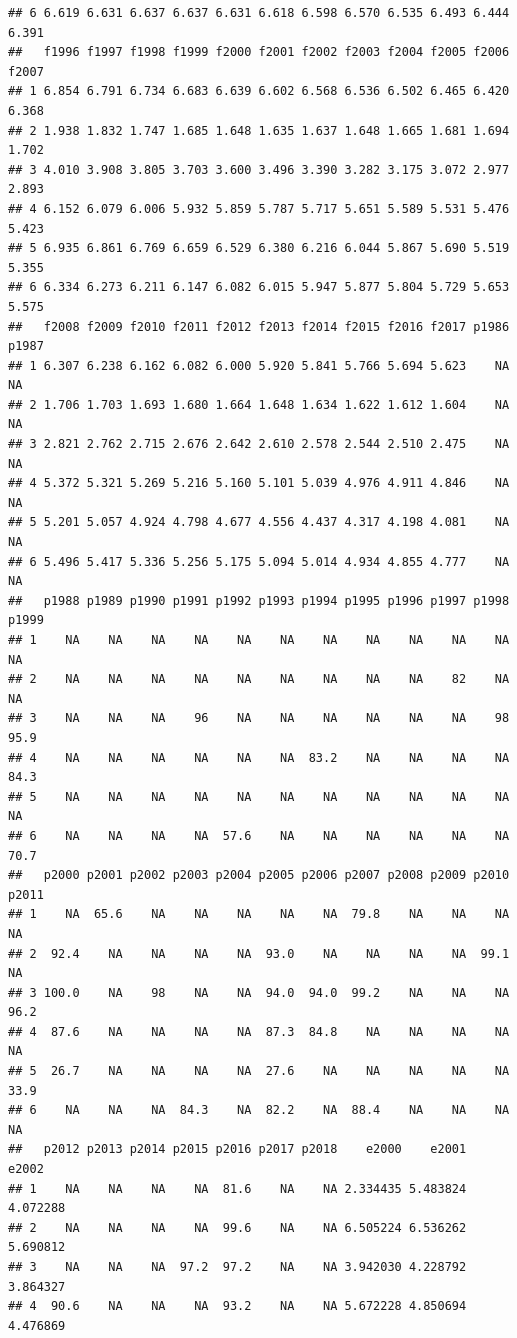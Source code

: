 \documentclass[]{book}
\begin{document}
\begin{verbatim}
## 6 6.619 6.631 6.637 6.637 6.631 6.618 6.598 6.570 6.535 6.493 6.444 6.391
##   f1996 f1997 f1998 f1999 f2000 f2001 f2002 f2003 f2004 f2005 f2006 f2007
## 1 6.854 6.791 6.734 6.683 6.639 6.602 6.568 6.536 6.502 6.465 6.420 6.368
## 2 1.938 1.832 1.747 1.685 1.648 1.635 1.637 1.648 1.665 1.681 1.694 1.702
## 3 4.010 3.908 3.805 3.703 3.600 3.496 3.390 3.282 3.175 3.072 2.977 2.893
## 4 6.152 6.079 6.006 5.932 5.859 5.787 5.717 5.651 5.589 5.531 5.476 5.423
## 5 6.935 6.861 6.769 6.659 6.529 6.380 6.216 6.044 5.867 5.690 5.519 5.355
## 6 6.334 6.273 6.211 6.147 6.082 6.015 5.947 5.877 5.804 5.729 5.653 5.575
##   f2008 f2009 f2010 f2011 f2012 f2013 f2014 f2015 f2016 f2017 p1986 p1987
## 1 6.307 6.238 6.162 6.082 6.000 5.920 5.841 5.766 5.694 5.623    NA    NA
## 2 1.706 1.703 1.693 1.680 1.664 1.648 1.634 1.622 1.612 1.604    NA    NA
## 3 2.821 2.762 2.715 2.676 2.642 2.610 2.578 2.544 2.510 2.475    NA    NA
## 4 5.372 5.321 5.269 5.216 5.160 5.101 5.039 4.976 4.911 4.846    NA    NA
## 5 5.201 5.057 4.924 4.798 4.677 4.556 4.437 4.317 4.198 4.081    NA    NA
## 6 5.496 5.417 5.336 5.256 5.175 5.094 5.014 4.934 4.855 4.777    NA    NA
##   p1988 p1989 p1990 p1991 p1992 p1993 p1994 p1995 p1996 p1997 p1998 p1999
## 1    NA    NA    NA    NA    NA    NA    NA    NA    NA    NA    NA    NA
## 2    NA    NA    NA    NA    NA    NA    NA    NA    NA    82    NA    NA
## 3    NA    NA    NA    96    NA    NA    NA    NA    NA    NA    98  95.9
## 4    NA    NA    NA    NA    NA    NA  83.2    NA    NA    NA    NA  84.3
## 5    NA    NA    NA    NA    NA    NA    NA    NA    NA    NA    NA    NA
## 6    NA    NA    NA    NA  57.6    NA    NA    NA    NA    NA    NA  70.7
##   p2000 p2001 p2002 p2003 p2004 p2005 p2006 p2007 p2008 p2009 p2010 p2011
## 1    NA  65.6    NA    NA    NA    NA    NA  79.8    NA    NA    NA    NA
## 2  92.4    NA    NA    NA    NA  93.0    NA    NA    NA    NA  99.1    NA
## 3 100.0    NA    98    NA    NA  94.0  94.0  99.2    NA    NA    NA  96.2
## 4  87.6    NA    NA    NA    NA  87.3  84.8    NA    NA    NA    NA    NA
## 5  26.7    NA    NA    NA    NA  27.6    NA    NA    NA    NA    NA  33.9
## 6    NA    NA    NA  84.3    NA  82.2    NA  88.4    NA    NA    NA    NA
##   p2012 p2013 p2014 p2015 p2016 p2017 p2018    e2000    e2001    e2002
## 1    NA    NA    NA    NA  81.6    NA    NA 2.334435 5.483824 4.072288
## 2    NA    NA    NA    NA  99.6    NA    NA 6.505224 6.536262 5.690812
## 3    NA    NA    NA  97.2  97.2    NA    NA 3.942030 4.228792 3.864327
## 4  90.6    NA    NA    NA  93.2    NA    NA 5.672228 4.850694 4.476869

\end{verbatim}
\end{document}

